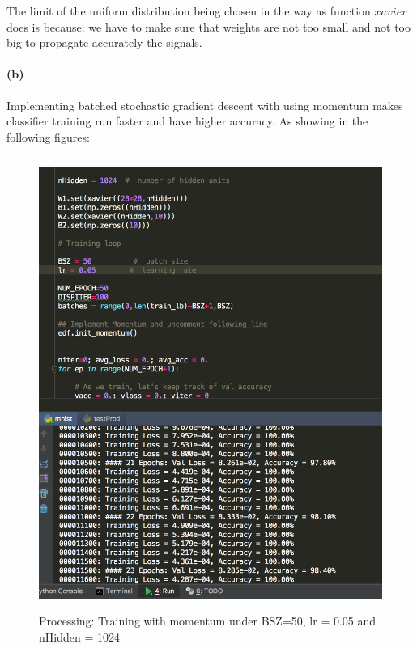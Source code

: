 \documentclass{article}
\newcommand{\spart}[1]{\paragraph{(#1)}}
\begin{document}
The limit of the uniform distribution being chosen in the way as function $xavier$ does is because: we have to make sure that weights are not too small and not too big to propagate accurately the signals.
\spart{b}
Implementing batched stochastic gradient descent with using momentum makes classifier training run faster and have higher accuracy. As showing in the following figures:

\begin{figure}[h!]
  \centering
	\includegraphics[height=40em]{screenshots/prob2(b)50-005-1024-1.png}
	\caption{Processing: Training with momentum under BSZ=50, lr = 0.05 and nHidden = 1024}
\end{figure}
\end{document}

